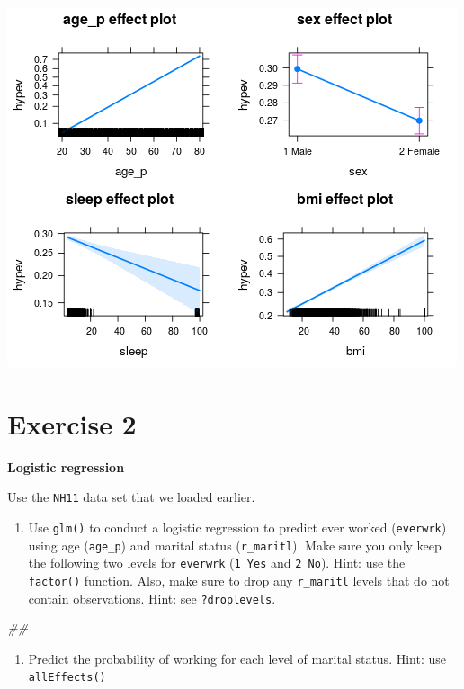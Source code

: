 \documentclass[]{book}
\newenvironment{Shaded}{\begin{snugshade}}{\end{snugshade}}
\newcommand{\CommentTok}[1]{\textcolor[rgb]{0.56,0.35,0.01}{\textit{#1}}}
\providecommand{\tightlist}{%
  \setlength{\itemsep}{0pt}\setlength{\parskip}{0pt}}
\begin{document}
\includegraphics{R/Rmodels/images/effects1.png}

\hypertarget{exercise-2}{%
\section{Exercise 2}\label{exercise-2}}

\textbf{Logistic regression}

Use the \texttt{NH11} data set that we loaded earlier.

\begin{enumerate}
\def\labelenumi{\arabic{enumi}.}
\tightlist
\item
  Use \texttt{glm()} to conduct a logistic regression to predict ever worked (\texttt{everwrk}) using age (\texttt{age\_p}) and marital status (\texttt{r\_maritl}). Make sure you only keep the following two levels for \texttt{everwrk} (\texttt{1\ Yes} and \texttt{2\ No}). Hint: use the \texttt{factor()} function. Also, make sure to drop any \texttt{r\_maritl} levels that do not contain observations. Hint: see \texttt{?droplevels}.
\end{enumerate}

\begin{Shaded}
\begin{Highlighting}[]
\CommentTok{## }
\end{Highlighting}
\end{Shaded}

\begin{enumerate}
\def\labelenumi{\arabic{enumi}.}
\setcounter{enumi}{1}
\tightlist
\item
  Predict the probability of working for each level of marital status. Hint: use \texttt{allEffects()}
\end{enumerate}
\end{document}
